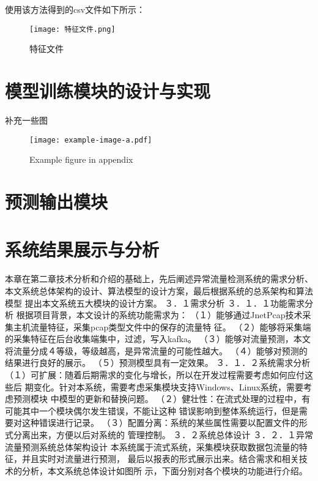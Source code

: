 使用该方法得到的csv文件如下所示：
\begin{figure}
    \centering
    \texttt{[image: 特征文件.png]}
    \caption{特征文件}
    \label{fig:特征文件}
  \end{figure}


\section{模型训练模块的设计与实现}
补充一些图
\begin{figure}
  \centering
  \texttt{[image: example-image-a.pdf]}
  \caption{Example figure in appendix}
  \label{fig:appendix-survey-figure}
\end{figure}
\section{预测输出模块}
\section{系统结果展示与分析}
本章在第二章技术分析和介绍的基础上，先后阐述异常流量检测系统的需求分析、
本文系统总体架构的设计、算法模型的设计方案，最后根据系统的总系架构和算法模型
提出本文系统五大模块的设计方案。
３．１需求分析
３．１．１功能需求分析
根据项目背景，本文设计的系统功能需求为：
（１）能够通过JnetPcap技术采集主机流量特征，采集pcap类型文件中的保存的流量特
征。
（２）能够将采集端的采集特征在后台收集端集中，过滤，写入kafka。
（３）能够对流量预测，本文将流量分成４等级，等级越高，是异常流量的可能性越大。
（４）能够对预测的结果进行良好的展示。
（５）预测模型具有一定效果。
３．１．２系统需求分析
（１）可扩展：随着后期需求的变化与增长，所以在开发过程需要考虑如何应付这些后
期变化。针对本系统，需要考虑采集模块支持Windows、Linux系统，需要考虑预测模块
中模型的更新和替换问题。
（２）健壮性：在流式处理的过程中，有可能其中一个模块偶尔发生错误，不能让这种
错误影响到整体系统运行，但是需要对这种错误进行记录。
（３）配置分离：系统的某些属性需要以配置文件的形式分离出来，方便以后对系统的
管理控制。
３．２系统总体设计
３．２．１异常流量预测系统总体架构设计
本系统属于流式系统，采集模块获取数据包流量的特征，并且实时对流量进行预测，
最后以报表的形式展示出来。结合需求和相关技术的分析，本文系统总体设计如图所
示，下面分别对各个模块的功能进行介绍。

